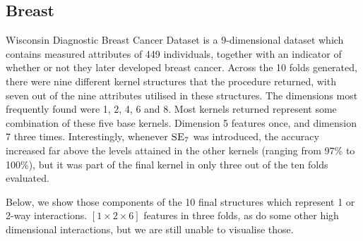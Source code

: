 \documentclass[a4paper,12pt ]{report}
\begin{document}
\begin{center}

\end{center}

\subsection{Breast} 

Wisconsin Diagnostic Breast Cancer Dataset is a 9-dimensional dataset which contains measured attributes of 449 individuals, together with an indicator of whether or not they later developed breast cancer. Across the 10 folds generated, there were nine different kernel structures
that the procedure returned, with seven out of the nine attributes utilised in these structures. The dimensions most frequently found were 1, 2, 4, 6 and 8. Most kernels returned represent some combination of these five base kernels. Dimension 5 features once, and dimension 7 
three times. Interestingly, whenever $\textsc{SE}_7$ was introduced, the accuracy increased far above the levels attained in the other kernels (ranging from 97\% to 100\%), but it was part of the final kernel in only three out of the ten folds evaluated. 

Below, we show those components of the 10 final structures which represent 1 or 2-way interactions. $[1 \times 2 \times 6]$ features in three folds, as do some other high dimensional interactions, but we are still unable to visualise those. 
\end{document}
